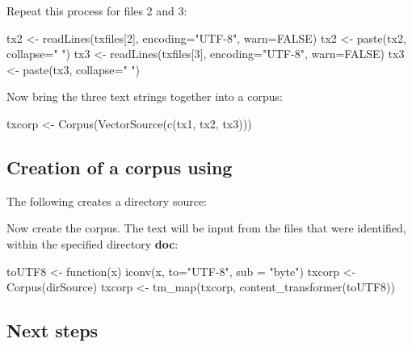 Repeat this process for files 2 and 3:
\begin{fullwidth}
\begin{Schunk}
\begin{Sinput}
tx2 <- readLines(txfiles[2], encoding="UTF-8", warn=FALSE)
tx2 <- paste(tx2, collapse=" ")
tx3 <- readLines(txfiles[3], encoding="UTF-8", warn=FALSE)
tx3 <- paste(tx3, collapse=" ")
\end{Sinput}
\end{Schunk}
\end{fullwidth}

Now bring the three text strings together into a corpus:
\begin{Schunk}
\begin{Sinput}
txcorp <- Corpus(VectorSource(c(tx1, tx2, tx3)))
\end{Sinput}
\end{Schunk}

\subsection*{Creation of a corpus using }

The following creates a directory source:
\begin{Schunk}
\end{Schunk}

Now create the corpus.  The text will be input from the files that
were identified, within the specified directory {\bf doc}:
\begin{Schunk}
\begin{Sinput}
toUTF8 <- function(x) iconv(x, to="UTF-8",
                            sub = "byte")
txcorp <- Corpus(dirSource)
txcorp <- tm_map(txcorp,
    content_transformer(toUTF8))
\end{Sinput}
\end{Schunk}

\subsection*{Next steps}

